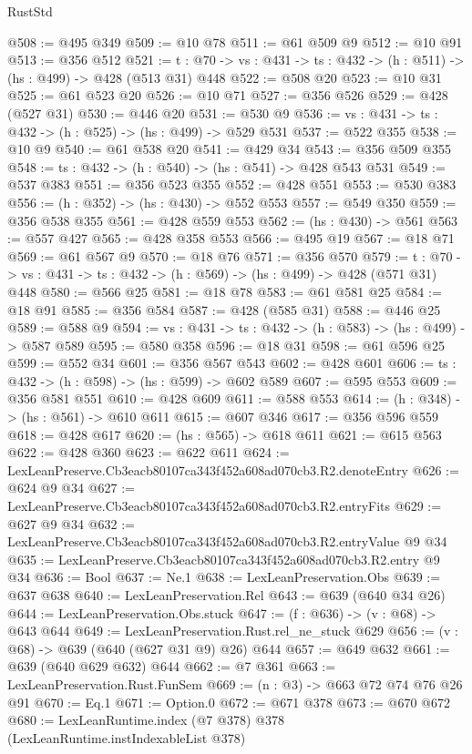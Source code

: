\begin{lexlean}{RustStd}
\begin{coremodule}
@508 := @495 @349
@509 := @10 @78
@511 := @61 @509 @9
@512 := @10 @91
@513 := @356 @512
@521 := {t : @70} -> {vs : @431} -> {ts : @432} -> (h : @511) -> (hs : @499) -> @428 (@513 @31) @448
@522 := @508 @20
@523 := @10 @31
@525 := @61 @523 @20
@526 := @10 @71
@527 := @356 @526
@529 := @428 (@527 @31)
@530 := @446 @20
@531 := @530 @9
@536 := {vs : @431} -> {ts : @432} -> (h : @525) -> (hs : @499) -> @529 @531
@537 := @522 @355
@538 := @10 @9
@540 := @61 @538 @20
@541 := @429 @34
@543 := @356 @509 @355
@548 := {ts : @432} -> (h : @540) -> (hs : @541) -> @428 @543 @531
@549 := @537 @383
@551 := @356 @523 @355
@552 := @428 @551
@553 := @530 @383
@556 := (h : @352) -> (hs : @430) -> @552 @553
@557 := @549 @350
@559 := @356 @538 @355
@561 := @428 @559 @553
@562 := (hs : @430) -> @561
@563 := @557 @427
@565 := @428 @358 @553
@566 := @495 @19
@567 := @18 @71
@569 := @61 @567 @9
@570 := @18 @76
@571 := @356 @570
@579 := {t : @70} -> {vs : @431} -> {ts : @432} -> (h : @569) -> (hs : @499) -> @428 (@571 @31) @448
@580 := @566 @25
@581 := @18 @78
@583 := @61 @581 @25
@584 := @18 @91
@585 := @356 @584
@587 := @428 (@585 @31)
@588 := @446 @25
@589 := @588 @9
@594 := {vs : @431} -> {ts : @432} -> (h : @583) -> (hs : @499) -> @587 @589
@595 := @580 @358
@596 := @18 @31
@598 := @61 @596 @25
@599 := @552 @34
@601 := @356 @567 @543
@602 := @428 @601
@606 := {ts : @432} -> (h : @598) -> (hs : @599) -> @602 @589
@607 := @595 @553
@609 := @356 @581 @551
@610 := @428 @609
@611 := @588 @553
@614 := (h : @348) -> (hs : @561) -> @610 @611
@615 := @607 @346
@617 := @356 @596 @559
@618 := @428 @617
@620 := (hs : @565) -> @618 @611
@621 := @615 @563
@622 := @428 @360
@623 := @622 @611
@624 := LexLeanPreserve.Cb3eacb80107ca343f452a608ad070cb3.R2.denoteEntry
@626 := @624 @9 @34
@627 := LexLeanPreserve.Cb3eacb80107ca343f452a608ad070cb3.R2.entryFits
@629 := @627 @9 @34
@632 := LexLeanPreserve.Cb3eacb80107ca343f452a608ad070cb3.R2.entryValue @9 @34
@635 := LexLeanPreserve.Cb3eacb80107ca343f452a608ad070cb3.R2.entry @9 @34
@636 := Bool
@637 := Ne.{1}
@638 := LexLeanPreservation.Obs
@639 := @637 @638
@640 := LexLeanPreservation.Rel
@643 := @639 (@640 @34 @26)
@644 := LexLeanPreservation.Obs.stuck
@647 := (f : @636) -> (v : @68) -> @643 @644
@649 := LexLeanPreservation.Rust.rel_ne_stuck @629
@656 := (v : @68) -> @639 (@640 (@627 @31 @9) @26) @644
@657 := @649 @632
@661 := @639 (@640 @629 @632) @644
@662 := @7 @361
@663 := LexLeanPreservation.Rust.FunSem
@669 := (n : @3) -> @663 @72 @74 @76 @26 @91
@670 := Eq.{1}
@671 := Option.{0}
@672 := @671 @378
@673 := @670 @672
@680 := LexLeanRuntime.index (@7 @378) @378 (LexLeanRuntime.instIndexableList @378)

\end{coremodule}
\end{lexlean}
